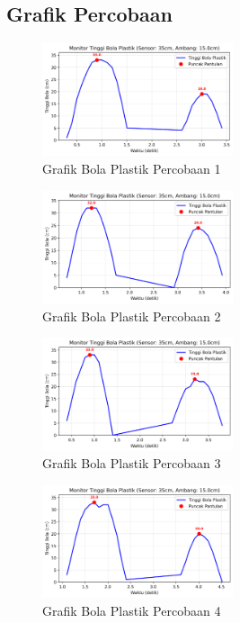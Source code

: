 \subsection{Grafik Percobaan}
\begin{figure}[htbp]
    \centering
    \includegraphics[width=0.5\textwidth]{chapters/DataPercobaan/Grafik_Bola_Plastik_1.png}
    \caption{Grafik Bola Plastik Percobaan 1}
\end{figure}
\begin{figure}[htbp]
    \centering
    \includegraphics[width=0.5\textwidth]{chapters/DataPercobaan/Grafik_Bola_Plastik_2.png}
    \caption{Grafik Bola Plastik Percobaan 2}
\end{figure}
\begin{figure}[htbp]
    \centering
    \includegraphics[width=0.5\textwidth]{chapters/DataPercobaan/Grafik_Bola_Plastik_3.png}
    \caption{Grafik Bola Plastik Percobaan 3}
\end{figure}
\begin{figure}[htbp]
    \centering
    \includegraphics[width=0.5\textwidth]{chapters/DataPercobaan/Grafik_Bola_Plastik_4.png}
    \caption{Grafik Bola Plastik Percobaan 4}
\end{figure}
